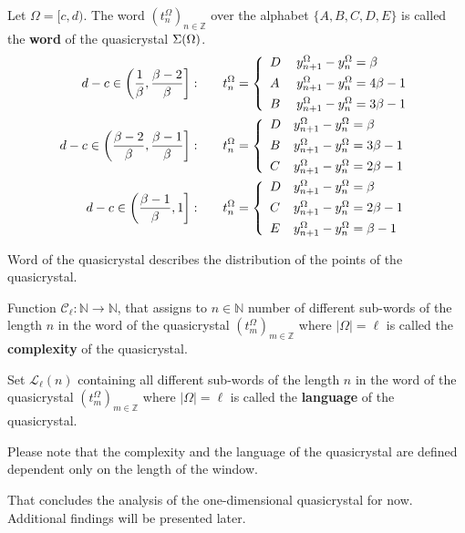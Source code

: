 \documentclass[text.tex]{subfiles}
\begin{document}
\begin{definition}
Let $\Omega = [c,d)$. The word $\left(t_n^\Omega\right)_{n\in\mathbb{Z}}$ over the alphabet $\{A,B,C,D,E\}$ is called the \textbf{word} of the quasicrystal $\Sigma(\Omega)$.
\begin{align*}
d-c \in \left( \frac{1}{\beta}, \frac{\beta - 2}{\beta} \right]:& \qquad
		t_n^\Omega = \left\{ \begin{array}{l l}
			D & y_{n+1}^\Omega - y_n^\Omega = \beta	\\[1.5mm]
			A~& y_{n+1}^\Omega - y_n^\Omega = 4\beta-1\\[1.5mm]
			B & y_{n+1}^\Omega - y_n^\Omega = 3\beta-1
		\end{array} \right.
\\
d-c \in \left( \frac{\beta-2}{\beta}, \frac{\beta-1}{\beta} \right]:& \qquad
		t_n^\Omega = \left\{ \begin{array}{l l}
			D & y_{n+1}^\Omega - y_n^\Omega = \beta	\\[1.5mm]
			B & y_{n+1}^\Omega - y_n^\Omega = 3\beta-1\\[1.5mm]
			C & y_{n+1}^\Omega - y_n^\Omega = 2\beta-1
		\end{array} \right.
\\
d-c \in \left( \frac{\beta-1}{\beta}, 1 \right]:& \qquad
		t_n^\Omega = \left\{ \begin{array}{l l}
			D & y_{n+1}^\Omega - y_n^\Omega = \beta	\\[1.5mm]
			C & y_{n+1}^\Omega - y_n^\Omega = 2\beta-1\\[1.5mm]
			E & y_{n+1}^\Omega - y_n^\Omega = \beta-1
		\end{array} \right.
\end{align*}
\end{definition}

\begin{remark}
Word of the quasicrystal describes the distribution of the points of the quasicrystal.
\end{remark}

\begin{definition}
Function $\mathcal{C}_\ell: \mathbb{N} \to \mathbb{N}$, that assigns to $n\in\mathbb{N}$ number of different sub-words of the length $n$ in the word of the quasicrystal $\left(t_m^\Omega\right)_{m\in\mathbb{Z}}$ where $|\Omega| = \ell$ is called the \textbf{complexity} of the quasicrystal.
\end{definition}

\begin{definition}
Set $\mathcal{L}_\ell(n)$ containing all different sub-words of the length $n$ in the word of the quasicrystal $\left(t_m^\Omega\right)_{m\in\mathbb{Z}}$ where $|\Omega| = \ell$ is called the \textbf{language} of the quasicrystal.
\end{definition}

\begin{remark}
Please note that the complexity and the language of the quasicrystal are defined dependent only on the length of the window. 
\end{remark}

That concludes the analysis of the one-dimensional quasicrystal for now. Additional findings will be presented later. 
\end{document}
